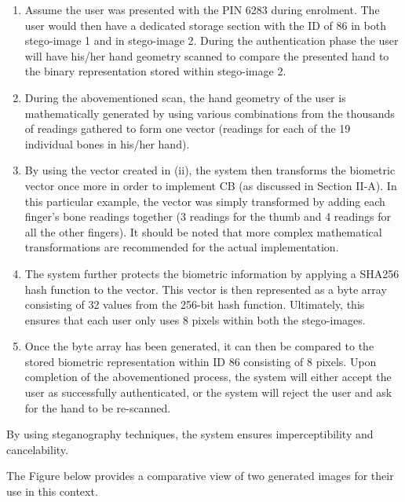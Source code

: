 \begin{enumerate}[label=\roman*.]
    
    \item  Assume the user was presented with the PIN 6283 during enrolment. The user would then have a dedicated storage section with the ID of 86 in both stego-image 1 and in stego-image 2. During the authentication phase the user will have his/her hand geometry scanned to compare the presented hand to the binary representation stored within stego-image 2. 
    
    \item  During the abovementioned scan, the hand geometry of the user is mathematically generated by using various combinations from the thousands of readings gathered to form one vector (readings for each of the 19 individual bones in his/her hand).
    
    \item By using the vector created in (ii), the system then transforms the biometric vector once more in order to implement CB (as discussed in Section II-A). In this particular example, the vector was simply transformed by adding each finger’s bone readings together (3 readings for the thumb and 4 readings for all the other fingers). It should be noted that more complex mathematical transformations are recommended for the actual implementation.
    
    \item The system further protects the biometric information by applying a SHA256 hash function to the vector. This vector is then represented as a byte array consisting of 32 values from the 256-bit hash function. Ultimately, this ensures that each user only uses 8 pixels within both the stego-images.
    
    \item Once the byte array has been generated, it can then be compared to the stored biometric representation within ID 86 consisting of 8 pixels.
Upon completion of the abovementioned process, the system will either accept the user as successfully authenticated, or the system will reject the user and ask for the hand to be re-scanned.

\end{enumerate}

By using steganography techniques, the system ensures imperceptibility and cancelability.

The Figure below provides a comparative view of two generated images for their use in this context. 

